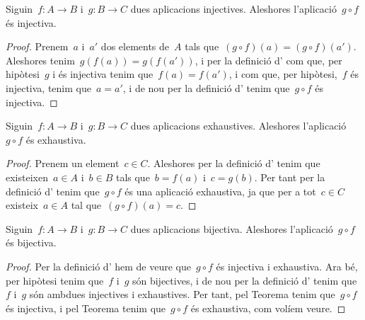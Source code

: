 \documentclass[../../main.tex]{subfiles}
\begin{document}
	\begin{theorem}
		\label{thm:composició d'injectives injectiva}
		Siguin~\(f\colon A\rightarrow B\) i~\(g\colon B\rightarrow C\) dues aplicacions injectives.
		Aleshores l'aplicació~\(g\circ f\) és injectiva.
		\begin{proof}
			Prenem~\(a\) i~\(a'\) dos elements de~\(A\) tals que~\((g\circ f)(a)=(g\circ f)(a')\).
			Aleshores tenim~\(g(f(a))=g(f(a'))\), i per la definició d' com que, per hipòtesi~\(g\) i és injectiva tenim que~\(f(a)=f(a')\), i com que, per hipòtesi,~\(f\) és injectiva, tenim que~\(a=a'\), i de nou per la definició d' tenim que~\(g\circ f\) és injectiva.
		\end{proof}
	\end{theorem}
	\begin{theorem}
		\label{thm:composició d'exhaustives exhaustiva}
		Siguin~\(f\colon A\rightarrow B\) i~\(g\colon B\rightarrow C\) dues aplicacions exhaustives.
		Aleshores l'aplicació~\(g\circ f\) és exhaustiva.
		\begin{proof}
			Prenem un element~\(c\in C\).
			Aleshores per la definició d' tenim que existeixen~\(a\in A\) i~\(b\in B\) tals que~\(b=f(a)\) i~\(c=g(b)\).
			Per tant per la definició d' tenim que~\(g\circ f\) és una aplicació exhaustiva, ja que per a tot~\(c\in C\) existeix~\(a\in A\) tal que~\((g\circ f)(a)=c\).
		\end{proof}
	\end{theorem}
	\begin{theorem}
		\label{thm:composició de bijectives bijectiva}
		\label{thm:conjugació de bijectives bijectiva}
		Siguin~\(f\colon A\rightarrow B\) i~\(g\colon B\rightarrow C\) dues aplicacions bijectiva.
		Aleshores l'aplicació~\(g\circ f\) és bijectiva.
		\begin{proof}
			Per la definició d' hem de veure que~\(g\circ f\) és injectiva i exhaustiva.
			Ara bé, per hipòtesi tenim que~\(f\) i~\(g\) són bijectives, i de nou per la definició d' tenim que~\(f\) i~\(g\) són ambdues injectives i exhaustives.
			Per tant, pel Teorema  tenim que~\(g\circ f\) és injectiva, i pel Teorema  tenim que~\(g\circ f\) és exhaustiva, com volíem veure.
		\end{proof}
	\end{theorem}
\end{document}

